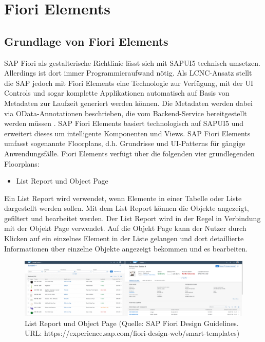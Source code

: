 \section{Fiori Elements}
\subsection{Grundlage von Fiori Elements}
SAP Fiori als gestalterische Richtlinie lässt sich mit SAPUI5 technisch umsetzen. Allerdings ist dort immer Programmieraufwand nötig. Als LCNC-Ansatz stellt die SAP jedoch mit Fiori Elements eine Technologie zur Verfügung, mit der UI Controls und sogar komplette Applikationen automatisch auf Basis von Metadaten zur Laufzeit generiert werden können. Die Metadaten werden dabei via OData-Annotationen beschrieben, die vom Backend-Service bereitgestellt werden müssen \cite[S.48]{fiori}. SAP Fiori Elements basiert technologisch auf SAPUI5 und erweitert dieses um intelligente Komponenten und Views. SAP Fiori Elements umfasst sogenannte Floorplans, d.h. Grundrisse und UI-Patterns für gängige Anwendungsfälle. Fiori Elements verfügt über die folgenden vier grundlegenden Floorplans:

\begin{itemize}[noitemsep]
\item List Report und Object Page
\end{itemize}

Ein List Report wird verwendet, wenn Elemente in einer Tabelle oder Liste dargestellt werden sollen. Mit dem List Report können die Objekte angezeigt, gefiltert und bearbeitet werden. Der List Report wird in der Regel in Verbindung mit der Objekt Page verwendet. Auf die Objekt Page kann der Nutzer durch Klicken auf ein einzelnes Element in der Liste gelangen und dort detaillierte Informationen über einzelne Objekte angezeigt bekommen und es bearbeiten.

\begin{figure}[htbp]
 \centering
 \includegraphics[width=1.0\textwidth]{Bilder/fiori_element/list_object_page.png}
 \caption{List Report und Object Page (Quelle: SAP Fiori Design Guidelines. URL: https://experience.sap.com/fiori-design-web/smart-templates)}
\end{figure} 

